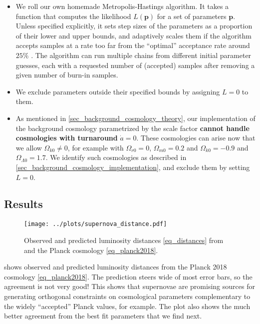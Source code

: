 \documentclass[10pt,a4paper]{article}
\begin{document}
\begin{itemize}
	\item We roll our own homemade Metropolis-Hastings algorithm.
	      It takes a function that computes the likelihood $L(\mathbf{p})$ for a set of parameters $\mathbf{p}$.
	      Unless specified explicitly, it sets step sizes of the parameters as a proportion of their lower and upper bounds,
		  and adaptively scales them if the algorithm accepts samples at a rate too far from the ``optimal'' acceptance rate around $25\%$ \cite{gelmanWeakConvergenceOptimal1997}.
		  The algorithm can run multiple chains from different initial parameter guesses,
		  each with a requested number of (accepted) samples after removing a given number of burn-in samples.
	\item We exclude parameters outside their specified bounds by assigning $L=0$ to them.
	\item As mentioned in \cref{sec_background_cosmology_theory},
	      our implementation of the background cosmology parametrized by the scale factor
	      \textbf{cannot handle cosmologies with turnaround} $\dot{a} = 0$.
	      These cosmologies can arise now that we allow $\Omega_{k0} \neq 0$,
	      for example with $\Omega_{r0}=0$, $\Omega_{m0} = 0.2$ and $\Omega_{k0} = -0.9$ and $\Omega_{\Lambda0} = 1.7$.
	      We identify such cosmologies as described in \cref{sec_background_cosmology_implementation}, and exclude them by setting $L=0$.
\end{itemize}

\subsection{Results}

\begin{figure}[!b]
	\centering
	\texttt{[image: ../plots/supernova\_distance.pdf]}
	\caption{Observed and predicted luminosity distances \eqref{eq_distances} from \cite{betouleImprovedCosmologicalConstraints2014} and the Planck cosmology \eqref{eq_planck2018}.}
	\label{fig_luminosity_distances}
\end{figure}

 shows observed and predicted luminosity distances from the Planck 2018 cosmology \eqref{eq_planck2018}.
The prediction steers wide of most error bars, so the agreement is not very good!
This shows that supernovae are promising sources for generating orthogonal constraints on cosmological parameters complementary to the widely ``accepted'' Planck values, for example.
The plot also shows the much better agreement from the best fit parameters that we find next.
\end{document}
